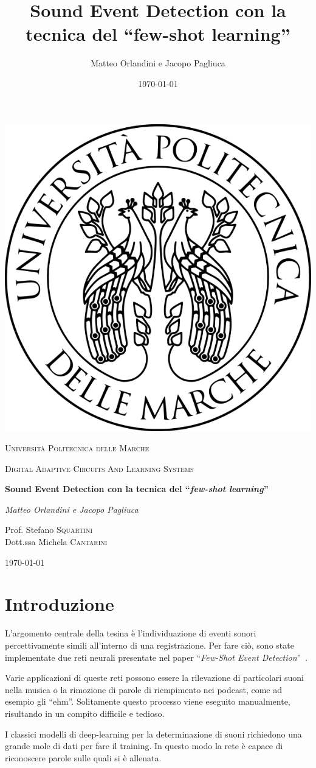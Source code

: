 \documentclass[12pt,a4paper,titlepage]{article}
\title{Sound Event Detection con la tecnica del ``few-shot learning''}
\author{Matteo Orlandini e Jacopo Pagliuca}
\date{\today}
\begin{document}
\begin{titlepage}
	
	\centering
	\includegraphics[width=.2\textwidth]{Immagini/univpmlogo}\par\vspace{1cm}
	{\scshape\LARGE Università Politecnica delle Marche\par}
	\vspace{1cm}
	{\scshape\Large Digital Adaptive Circuits And Learning Systems\par}
	\vspace{1.5cm}
	{\huge\bfseries Sound Event Detection con la tecnica del  ``\textit{few-shot learning}''  \par}
	\vspace{2cm}
	{\Large\itshape Matteo Orlandini e Jacopo Pagliuca\par}
	\vfill
	Prof. Stefano \textsc{Squartini}\\
	Dott.ssa Michela \textsc{Cantarini}
	
	\vfill
	
	{\large \today\par}
\end{titlepage}

\thispagestyle{empty}
\tableofcontents
\clearpage

\setcounter{page}{1}

\section{Introduzione}
\label{section:Introduzione}
L'argomento centrale della tesina è l'individuazione di eventi sonori percettivamente simili all'interno di una registrazione. Per fare ciò, sono state implementate due reti neurali presentate nel paper ``\textit{Few-Shot Event Detection}''~\cite{Salamon:Few-Shot}.

Varie applicazioni di queste reti possono essere la rilevazione di particolari suoni nella musica o la rimozione di parole di riempimento nei podcast, come ad esempio gli ``ehm''. Solitamente questo processo viene eseguito manualmente, risultando in un compito difficile e tedioso.

I classici modelli di deep-learning per la determinazione di suoni richiedono una grande mole di dati per fare il training. In questo modo la rete è capace di riconoscere parole sulle quali si è allenata.
\end{document}
